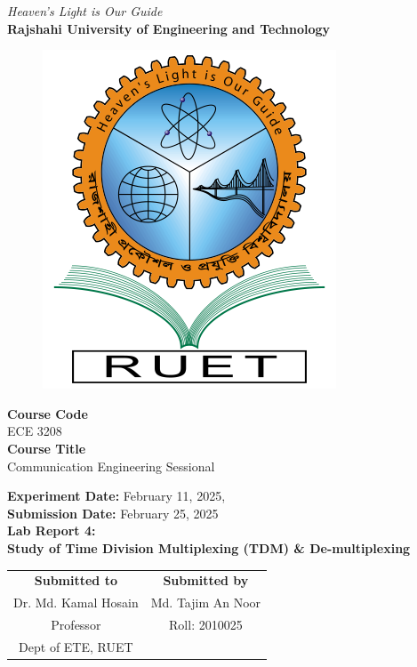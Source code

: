 \vspace*{\fill}
\begin{center}

    \emph{Heaven's Light is Our Guide} \\
    \textbf{Rajshahi University of Engineering and Technology} \\

    \begin{figure}[H]
        \centering
        \includegraphics[scale=.34]{images/RUET_logo.png}
        \label{fig:ruet_logo}
    \end{figure}
    \vspace{5mm}

    \textbf{Course Code}\\
    ECE 3208\\
    \vspace{3mm}
    \textbf{Course Title}\\
    Communication Engineering Sessional

    \vspace{5mm}
    \textbf{Experiment Date:} {February 11, 2025},\\
    \textbf{Submission Date:} {February 25, 2025}\\

    \vspace{5mm}
    \textbf{Lab Report 4: \\
        Study of Time Division Multiplexing (TDM) \& De-multiplexing}\\

    \vspace{15mm}

    \begin{tabular}{c|c}
        \textbf{Submitted to} & \textbf{Submitted by} \\
        Dr. Md. Kamal Hosain  & Md. Tajim An Noor     \\
        Professor             & Roll: 2010025         \\
        Dept of ETE, RUET     &                       \\
    \end{tabular}

\end{center}
\vspace*{\fill}
